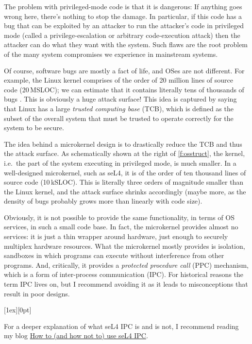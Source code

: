\documentclass[english,a4paper,12pt]{report}
\newlength{\chillilng}\setlength{\chillilng}{8mm}
\newlength{\chillimarg}\setlength{\chillimarg}{10mm}
\newcommand{\chilli}{\texttt{[image: chilli]}}
\newcommand{\chilliItem}{\raisebox{-5mm}[1ex][0pt]{%
      \makebox[\chillilng][r]{\chilli}}}
\newenvironment{Chilli}{
    \begin{list}{}{
      \setlength{\labelwidth}{\chillilng}
      \setlength{\leftmargin}{\chillimarg}}
    \item[\chilliItem]
    }
  {\end{list}}
\begin{document}
  The problem with privileged-mode code is that it is dangerous: If
  anything goes wrong here, there's nothing to stop the damage. In
  particular, if this code has a bug that can be exploited by an
  attacker to run the attacker's code in privileged mode (called a
  privilege-escalation or arbitrary code-execution attack) then the
  attacker can do what they want with the system. Such flaws are the
  root problem of the many system compromises we experience in
  mainstream systems.

  Of course, software bugs are mostly a fact of life, and
  OSes are not different.  For example, the Linux kernel comprises of
  the order of 20 million lines of source code (20\,MSLOC); we can
  estimate that it contains literally tens of thousands of bugs
  \citep{Biggs_LH_18}. This is obviously a huge attack surface! This
  idea is captured by saying that Linux has a large \emph{trusted computing
    base} (TCB), which is defined as the subset of the overall system
  that must be trusted to operate correctly for the system to be
  secure.

  The idea behind a microkernel design is to drastically reduce the
  TCB and thus the
  attack surface. As schematically shown at the right of
  \autoref{f:osstruct}, the kernel, i.e.\ the part of the system
  executing in privileged mode, is much smaller. In a well-designed
  microkernel, such as seL4, it is of the order of ten thousand lines
  of source code (10\,kSLOC). This is literally three orders of
  magnitude smaller than the Linux kernel, and the attack surface shrinks
  accordingly (maybe more, as the density of bugs probably
  grows more than linearly with code size).

  Obviously, it is not possible to provide the same functionality, in
  terms of OS services, in such a small code base. In fact, the
  microkernel provides almost no services: it is just a thin wrapper
  around hardware, just enough to securely multiplex hardware
  resources. What the microkernel mostly provides is isolation,
  sandboxes in which programs can execute without interference from
  other programs. And, critically, it provides a \emph{protected
    procedure call} (PPC) mechanism, which is a form of inter-process
  communication (IPC). For historical reasons the term IPC lives on,
  but I recommend avoiding it as it leads to misconceptions that
  result in poor designs.

  \begin{Chilli}
    For a deeper explanation of what seL4 IPC is and is not, I
    recommend reading my blog \href{https://microkerneldude.wordpress.com/2019/03/07/how-to-and-how-not-to-use-sel4-ipc/}{How to (and how not to) use seL4 IPC}.
  \end{Chilli}
\end{document}
